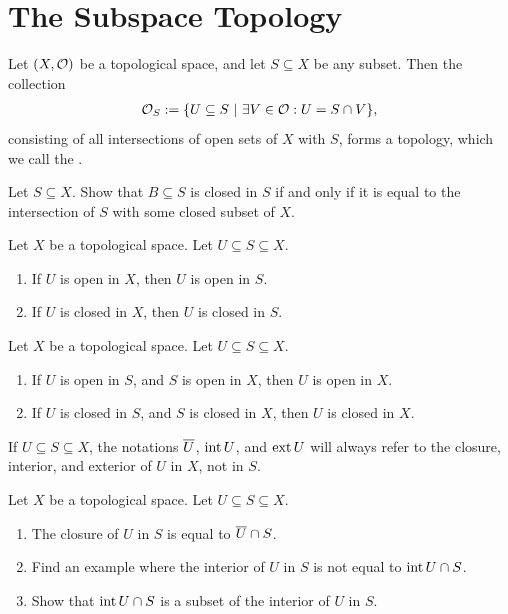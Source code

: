 \section{The Subspace Topology}
\begin{importanttheorem}{}{}
	Let $(X, \mathcal{O})$ be a topological space, and let $S \subseteq X$ be any subset. Then the collection
	\begin{align*}
		\mathcal{O}_S := \qty{U \subseteq S ~\middle|~\exists V \in \mathcal{O}: U = S \cap V},
	\end{align*}
	consisting of all intersections of open sets of $X$ with $S$, forms a topology, which we call the .
\end{importanttheorem}
\begin{exercise}
	Let $S \subseteq X$. Show that $B \subseteq S$ is closed in $S$ if and only if it is equal to the intersection of $S$ with some closed subset of $X$.
\end{exercise}
\begin{exercise}
	Let $X$ be a topological space. Let $U \subseteq S \subseteq X$.
	\begin{enumerate}
		\item If $U$ is open in $X$, then $U$ is open in $S$.
		\item If $U$ is closed in $X$, then $U$ is closed in $S$.
	\end{enumerate}
\end{exercise}
\begin{exercise}
	Let $X$ be a topological space. Let $U \subseteq S \subseteq X$.
	\begin{enumerate}
		\item If $U$ is open in $S$, and $S$ is open in $X$, then $U$ is open in $X$.
		\item If $U$ is closed in $S$, and $S$ is closed in $X$, then $U$ is closed in $X$.
	\end{enumerate}
\end{exercise}
If $U \subseteq S \subseteq X$, the notations $\overline{{U}}$, $\operatorname{int} U$, and $\operatorname{ext} U$ will always refer to the closure, interior, and exterior of $U$ in $X$, not in $S$.
\begin{exercise}
	Let $X$ be a topological space. Let $U \subseteq S \subseteq X$.
	\begin{enumerate}
		\item The closure of $U$ in $S$ is equal to $\overline{{U}} \cap S$.
		\item Find an example where the interior of $U$ in $S$ is not equal to $\operatorname{int} U \cap S$.
		\item Show that $\operatorname{int} U \cap S$ is a subset of the interior of $U$ in $S$.
	\end{enumerate}
\end{exercise}
